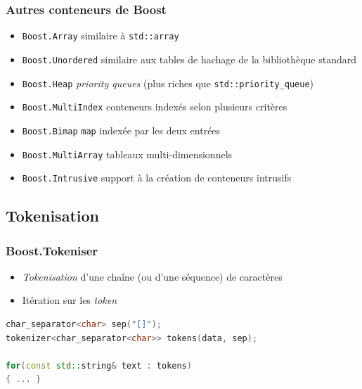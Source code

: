 \documentclass[C++.tex]{subfiles}
\begin{document}
\begin{frame}[fragile]
	\frametitle{Autres conteneurs de Boost}
	\begin{itemize}
		\item \lstinline|Boost.Array| similaire à \lstinline|std::array|
		\item \lstinline|Boost.Unordered| similaire aux tables de hachage de la bibliothèque standard


		\item \lstinline|Boost.Heap| \textit{priority queues} (plus riches que \lstinline|std::priority_queue|)
		\item \lstinline|Boost.MultiIndex| conteneurs indexés selon plusieurs critères
		\item \lstinline|Boost.Bimap| \lstinline|map| indexée par les deux entrées
		\item \lstinline|Boost.MultiArray| tableaux multi-dimensionnels
		\item \lstinline|Boost.Intrusive| support à la création de conteneurs intrusifs

	\end{itemize}
\end{frame}

\subsection*{Tokenisation}
\begin{frame}[fragile]
	\frametitle{Boost.Tokeniser}
	\begin{itemize}
		\item \textit{Tokenisation} d'une chaîne (ou d'une séquence) de caractères
		\item Itération sur les \textit{token}
	\end{itemize}




	\begin{lstlisting}[language=C++]
char_separator<char> sep("[]");
tokenizer<char_separator<char>> tokens(data, sep);

for(const std::string& text : tokens)
{ ... }\end{lstlisting}
\end{frame}
\end{document}
